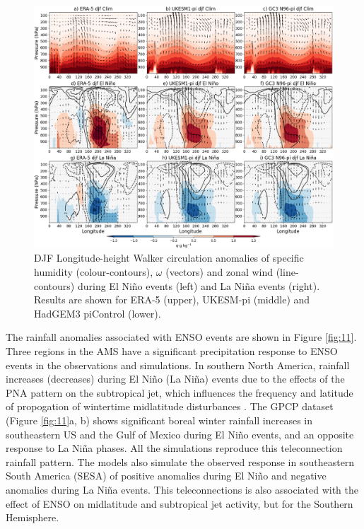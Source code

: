 \begin{figure}
\includegraphics[width=\linewidth]{figures/walkerfinal}
\caption{DJF Longitude-height Walker circulation anomalies of specific humidity (colour-contours), $\omega$ (vectors) and zonal wind (line-contours) during El Niño events (left) and La Niña events (right). Results are shown for ERA-5 (upper), UKESM-pi (middle) and HadGEM3 piControl (lower).}
\label{fig:swalker}
\end{figure}


The rainfall anomalies associated with ENSO events are shown in Figure \ref{fig:11}. Three regions in the AMS have a significant precipitation response to ENSO events in the observations and simulations.
In southern North America, rainfall increases (decreases) during El Ni\~no (La Ni\~na) events due to the effects of the PNA pattern on the subtropical jet, which influences the frequency and latitude of propogation of wintertime midlatitude disturbances \citep{vera2006,bayr2019}.
The GPCP dataset (Figure \ref{fig:11}a, b) shows significant boreal winter rainfall increases in southeastern US and the Gulf of Mexico during El Ni\~no events, and an opposite response to La Ni\~na phases. All the simulations reproduce this teleconnection rainfall pattern. 
The models also simulate the observed response in southeastern South America (SESA) of positive anomalies during El Ni\~no and negative anomalies during La Ni\~na events. This teleconnections is also associated with the effect of ENSO on midlatitude and subtropical jet activity, but for the Southern Hemisphere.


